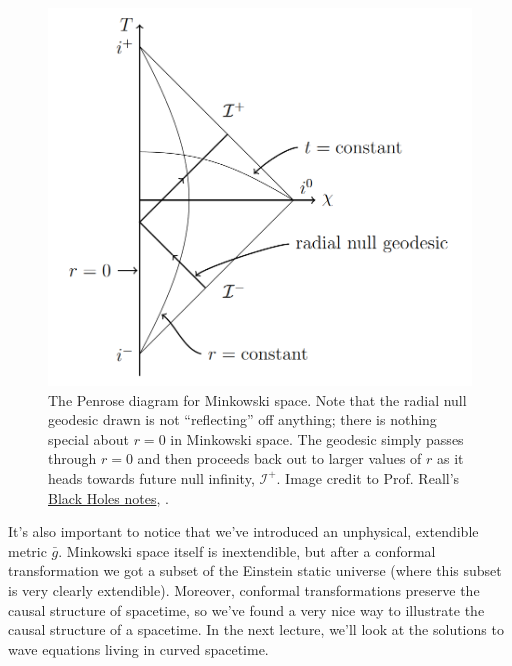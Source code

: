 \begin{figure}
    \centering
    \includegraphics{2019/02/20190222_reallminkowskipenrose}
    \caption{The Penrose diagram for Minkowski space. Note that the radial null geodesic drawn is not ``reflecting'' off anything; there is nothing special about $r=0$ in Minkowski space. The geodesic simply passes through $r=0$ and then proceeds back out to larger values of $r$ as it heads towards future null infinity, $\mathcal{I}^+$.\newline
    Image credit to Prof. Reall's  \href{http://www.damtp.cam.ac.uk/user/hsr1000/black_holes_lectures_2016.pdf}{Black Holes notes}, .}
    \label{fig:reallminkowskipenrose}
\end{figure}

It's also important to notice that we've introduced an unphysical, extendible metric $\bar g$. Minkowski space itself is inextendible, but after a conformal transformation we got a subset of the Einstein static universe (where this subset is very clearly extendible). Moreover, conformal transformations preserve the causal structure of spacetime, so we've found a very nice way to illustrate the causal structure of a spacetime. In the next lecture, we'll look at the solutions to wave equations living in curved spacetime.